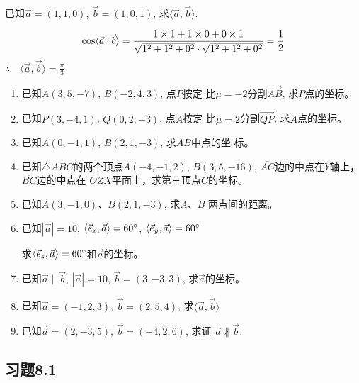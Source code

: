 \begin{example}
    已知$\vec{a}=(1,1,0)$, $\vec{b}=(1,0,1)$, 
求$\langle \vec{a},\vec{b}\rangle$.
\end{example}

\begin{solution}
\[\cos\langle \vec{a}\cdot \vec{b} \rangle=\dfrac{1\times 1+1\times 0+0\times 1}{\sqrt{1^2+1^2+0^2}\cdot \sqrt{1^2+1^2+0^2}}=\dfrac{1}{2} \]
$\therefore\quad \langle \vec{a},\vec{b}\rangle=\frac{\pi}{3}$    
\end{solution}

\begin{ex}
\begin{enumerate}
    \item 已知$A(3,5,-7)$, $B(-2,4,3)$, 点$P$按定
    比$\mu=-2$分割$\Vec{AB}$, 求$P$点的坐标。
    \item 已知$P(3,-4,1)$, $Q(0,2,-3)$, 点$A$按定
    比$\mu=2$分割$\Vec{QP}$, 求$A$点的坐标。
    \item 已知$A(0,-1,1)$, $B(2,1,-3)$, 求$\overline{AB}$中点的坐
    标。
    \item 已知$\triangle ABC$的两个顶点$A(-4,-1,2)$, $B(3,
    5,-16)$, $\overline{AC}$边的中点在$Y$轴上，
    $\overline{BC}$边的中点在
    $OZX$平面上，求第三顶点$C$的坐标。
    \item 已知$A(3,-1,0)$、$B(2,1,-3)$, 求$A$、$B$
    两点间的距离。
    \item 已知$|\vec{a}|=10$, $\langle \vec{e}_x,\vec{a} \rangle=60^{\circ}$, $\langle \vec{e}_y,\vec{a} \rangle=60^{\circ}$

    求$\langle \vec{e}_z,\vec{a} \rangle=60^{\circ}$和$\vec{a}$的坐标。
\item 已知$\vec{a}\parallel \vec{b}$, $|\vec{a}|=10$, $\vec{b}=(3,-3,3)$, 求$\vec{a}$的坐标。

\item 已知$\vec{a}=(-1,2,3)$, $\vec{b}=(2,5,4)$, 求$\langle \vec{a},\vec{b} \rangle$

\item 已知$\vec{a}=(2,-3,5)$, $\vec{b}=(-4,2,6)$, 求证
$\vec{a}\nparallel \vec{b}$.
\end{enumerate}
\end{ex}

\subsection*{习题8.1}

